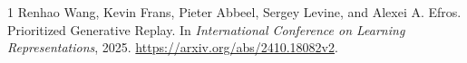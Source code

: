 \documentclass[11pt,letterpaper]{cmu}
\begin{document}
\begin{thebibliography}{1}
Renhao Wang, Kevin Frans, Pieter Abbeel, Sergey Levine, and Alexei A. Efros.
Prioritized Generative Replay.
In \emph{International Conference on Learning Representations}, 2025.
\url{https://arxiv.org/abs/2410.18082v2}.
\end{thebibliography}
\end{document}
